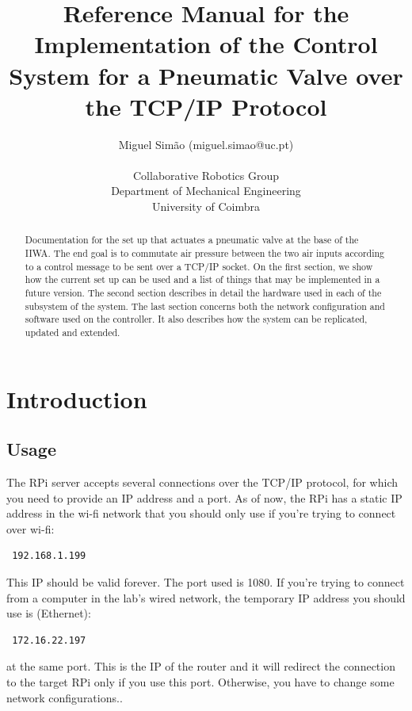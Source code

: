 \documentclass[twoside,a4paper]{refart}
\author{Miguel Sim\~ao (miguel.simao@uc.pt) \\
		\ \\
		Collaborative Robotics Group \\
		Department of Mechanical Engineering \\
		University of Coimbra}
\title{Reference Manual for the Implementation of the Control System for a Pneumatic Valve over the TCP/IP Protocol}
\date{}
\begin{document}
	
\maketitle


\begin{abstract}
	Documentation for the set up that actuates a pneumatic valve at the base of the IIWA. The end goal is to commutate air pressure between the two air inputs according to a control message to be sent over a TCP/IP socket. On the first section, we show how the current set up can be used and a list of things that may be implemented in a future version. The second section describes in detail the hardware used in each of the subsystem of the system. The last section concerns both the network configuration and software used on the controller. It also describes how the system can be replicated, updated and extended.
\end{abstract}

\tableofcontents

\newpage





\section{Introduction}
\subsection{Usage}
The RPi server accepts several connections over the TCP/IP protocol, for which you need to provide an IP address and a port. As of now, the RPi has a static IP address in the wi-fi network that you should only use if you're trying to connect over wi-fi:
\begin{verbatim} 192.168.1.199 \end{verbatim}
This IP should be valid forever. The port used is 1080. If you're trying to connect from a computer in the lab's wired network, the temporary IP address you should use is (Ethernet):
\begin{verbatim} 172.16.22.197 \end{verbatim}
at the same port. This is the IP of the  router and it will redirect the connection to the target RPi only if you use this port. Otherwise, you have to change some network configurations..
\end{document}
